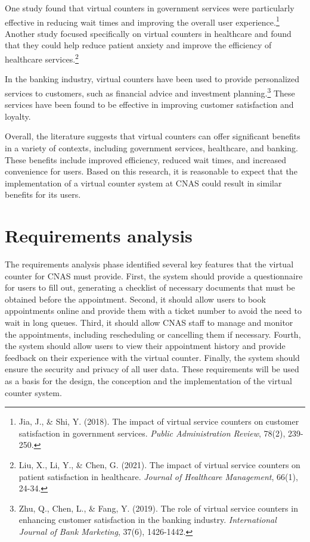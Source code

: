 One study found that virtual counters in government services were particularly effective in reducing wait times and improving the overall user experience.\footnote{Jia, J., \& Shi, Y. (2018). The impact of virtual service counters on customer satisfaction in government services. \textit{Public Administration Review}, 78(2), 239-250.} Another study focused specifically on virtual counters in healthcare and found that they could help reduce patient anxiety and improve the efficiency of healthcare services.\footnote{Liu, X., Li, Y., \& Chen, G. (2021). The impact of virtual service counters on patient satisfaction in healthcare. \textit{Journal of Healthcare Management}, 66(1), 24-34.}

In the banking industry, virtual counters have been used to provide personalized services to customers, such as financial advice and investment planning.\footnote{Zhu, Q., Chen, L., \& Fang, Y. (2019). The role of virtual service counters in enhancing customer satisfaction in the banking industry. \textit{International Journal of Bank Marketing}, 37(6), 1426-1442.} These services have been found to be effective in improving customer satisfaction and loyalty.

Overall, the literature suggests that virtual counters can offer significant benefits in a variety of contexts, including government services, healthcare, and banking. These benefits include improved efficiency, reduced wait times, and increased convenience for users. Based on this research, it is reasonable to expect that the implementation of a virtual counter system at CNAS could result in similar benefits for its users.

\section{Requirements analysis}
The requirements analysis phase identified several key features that the virtual counter for CNAS must provide. First, the system should provide a questionnaire for users to fill out, generating a checklist of necessary documents that must be obtained before the appointment. Second, it should allow users to book appointments online and provide them with a ticket number to avoid the need to wait in long queues. Third, it should allow CNAS staff to manage and monitor the appointments, including rescheduling or cancelling them if necessary. Fourth, the system should allow users to view their appointment history and provide feedback on their experience with the virtual counter. Finally, the system should ensure the security and privacy of all user data. These requirements will be used as a basis for the design, the conception and the implementation of the virtual counter system.

